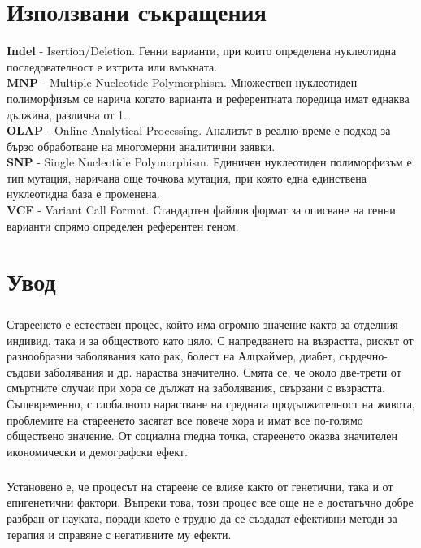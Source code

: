 \documentclass[pdftex,cyrillic,14pt,a4page,twoside]{extreport}
\newcommand\blankpage{%
    \null
    \thispagestyle{empty}%
    \newpage}
\begin{document}
\afterpage{\blankpage}


\tableofcontents
\pagebreak

\setlength\parindent{0pt}

\chapter*{Използвани съкращения}
\textbf{Indel} - Isertion/Deletion. Генни варианти, при които определена нуклеотидна последователност е изтрита или вмъкната.\\
\textbf{MNP} - Multiple Nucleotide Polymorphism. Множествен нуклеотиден полиморфизъм се нарича когато варианта и референтната поредица имат еднаква дължина, различна от 1.\\
\textbf{OLAP} - Online Analytical Processing. Aнализът в реално време е подход за бързо обработване на многомерни аналитични заявки.\\
\textbf{SNP} - Single Nucleotide Polymorphism. Единичен нуклеотиден полиморфизъм е тип мутация, наричана още точкова мутация, при която една единствена нуклеотидна база е променена.\\
\textbf{VCF} - Variant Call Format. Стандартен файлов формат за описване на генни варианти спрямо определен референтен геном.\\

\chapter{Увод}
\paragraph{}

Стареенето е естествен процес, който има огромно значение както за отделния индивид, така и за обществото като цяло. С напредването на възрастта, рискът от разнообразни заболявания като рак, болест на Алцхаймер, диабет, сърдечно-съдови заболявания и др. нараства значително. Смята се, че около две-трети от смъртните случаи при хора се дължат на заболявания, свързани с възрастта. Същевременно, с глобалното нарастване на средната продължителност на живота, проблемите на стареенето засягат все повече хора и имат все по-голямо обществено значение. От социална гледна точка, стареенето оказва значителен икономически и демографски ефект.

\paragraph{}
Установено е, че процесът на стареене се влияе както от генетични, така и от епигенетични фактори. Въпреки това, този процес все още не е достатъчно добре разбран от науката, поради което е трудно да се създадат ефективни методи за терапия и справяне с негативните му ефекти.
\end{document}
